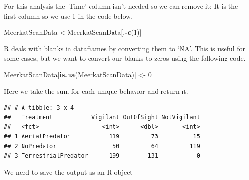 \documentclass[]{book}
\newenvironment{Shaded}{\begin{snugshade}}{\end{snugshade}}
\newcommand{\DataTypeTok}[1]{\textcolor[rgb]{0.13,0.29,0.53}{#1}}
\newcommand{\DecValTok}[1]{\textcolor[rgb]{0.00,0.00,0.81}{#1}}
\newcommand{\KeywordTok}[1]{\textcolor[rgb]{0.13,0.29,0.53}{\textbf{#1}}}
\newcommand{\NormalTok}[1]{#1}
\newcommand{\OperatorTok}[1]{\textcolor[rgb]{0.81,0.36,0.00}{\textbf{#1}}}
\newcommand{\StringTok}[1]{\textcolor[rgb]{0.31,0.60,0.02}{#1}}
\begin{document}
For this analysis the `Time' column isn't needed so we can remove it; It is the first column so we use 1 in the code below.

\begin{Shaded}
\begin{Highlighting}[]
\NormalTok{MeerkatScanData <-MeerkatScanData[,}\OperatorTok{-}\KeywordTok{c}\NormalTok{(}\DecValTok{1}\NormalTok{)]}
\end{Highlighting}
\end{Shaded}

R deals with blanks in dataframes by converting them to `NA'. This is useful for some cases, but we want to convert our blanks to zeros using the following code.

\begin{Shaded}
\begin{Highlighting}[]
\NormalTok{MeerkatScanData[}\KeywordTok{is.na}\NormalTok{(MeerkatScanData)] <-}\StringTok{ }\DecValTok{0}
\end{Highlighting}
\end{Shaded}

Here we take the sum for each unique behavior and return it.

\begin{Shaded}
\end{Shaded}

\begin{verbatim}
## # A tibble: 3 x 4
##   Treatment           Vigilant OutOfSight NotVigilant
##   <fct>                  <int>      <dbl>       <int>
## 1 AerialPredator           119         73          15
## 2 NoPredator                50         64         119
## 3 TerrestrialPredator      199        131           0
\end{verbatim}

We need to save the output as an R object

\begin{Shaded}
\end{Shaded}
\end{document}
